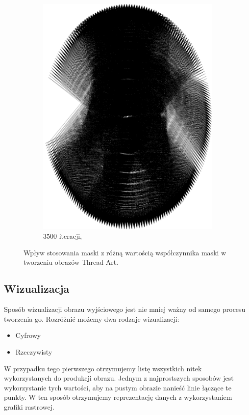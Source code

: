 \begin{figure}[H]
\begin{subfigure}{0.19\textwidth}
            \includegraphics[width = \textwidth]{img/2-theory/aldrin/100mask-aldrin_ellipse_3500_threaded.png}
            \caption{3500 iteracji, }
            \label{theory-technics-mask-aldrin-threaded-t}
        \end{subfigure}
        \caption{Wpływ stosowania maski z różną wartością współczynnika maski w tworzeniu obrazów Thread Art.}
        \label{theory-technics-mask-aldrin-threaded}
        \end{figure}
        
        \subsection{Wizualizacja}  \label{theory-technics-vis}
        Sposób wizualizacji obrazu wyjściowego jest nie mniej ważny od samego procesu tworzenia go. Rozróżnić możemy dwa rodzaje wizualizacji:
        \begin{itemize}
            \item Cyfrowy
            \item Rzeczywisty
        \end{itemize}
        W przypadku tego pierwszego otrzymujemy listę wszystkich nitek wykorzystanych do produkcji obrazu. Jednym z najprostszych sposobów jest wykorzystanie tych wartości, aby na pustym obrazie nanieść linie łączące te punkty. W ten sposób otrzymujemy reprezentację danych z wykorzystaniem grafiki rastrowej.
        
